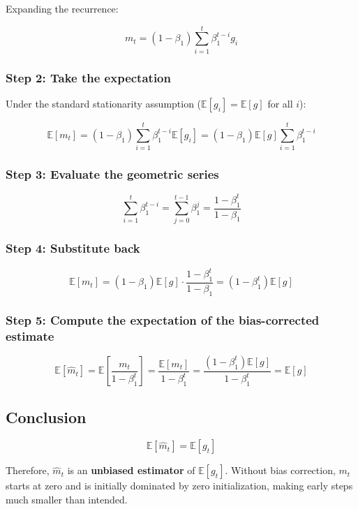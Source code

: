 \documentclass[11pt,a4paper]{article}
\begin{document}
Expanding the recurrence:

\[
m_t = (1-\beta_1) \sum_{i=1}^{t} \beta_1^{t-i} g_i
\]

\subsubsection*{Step 2: Take the expectation}

Under the standard stationarity assumption ($\mathbb{E}[g_i] = \mathbb{E}[g]$ for all $i$):

\[
\mathbb{E}[m_t] = (1-\beta_1) \sum_{i=1}^{t} \beta_1^{t-i} \mathbb{E}[g_i]
= (1-\beta_1) \mathbb{E}[g] \sum_{i=1}^{t} \beta_1^{t-i}
\]

\subsubsection*{Step 3: Evaluate the geometric series}

\[
\sum_{i=1}^{t} \beta_1^{t-i} = \sum_{j=0}^{t-1} \beta_1^{j}
= \frac{1-\beta_1^t}{1-\beta_1}
\]

\subsubsection*{Step 4: Substitute back}

\[
\mathbb{E}[m_t] = (1-\beta_1) \mathbb{E}[g] \cdot \frac{1-\beta_1^t}{1-\beta_1}
= (1-\beta_1^t) \mathbb{E}[g]
\]

\subsubsection*{Step 5: Compute the expectation of the bias-corrected estimate}

\[
\mathbb{E}[\hat{m}_t] = \mathbb{E}\left[\frac{m_t}{1-\beta_1^t}\right]
= \frac{\mathbb{E}[m_t]}{1-\beta_1^t}
= \frac{(1-\beta_1^t) \mathbb{E}[g]}{1-\beta_1^t}
= \mathbb{E}[g]
\]

\subsection*{Conclusion}

\[
\boxed{\mathbb{E}[\hat{m}_t] = \mathbb{E}[g_t]}
\]

Therefore, $\hat{m}_t$ is an \textbf{unbiased estimator} of $\mathbb{E}[g_t]$. Without bias correction, $m_t$ starts at zero and is initially dominated by zero initialization, making early steps much smaller than intended.
\end{document}
